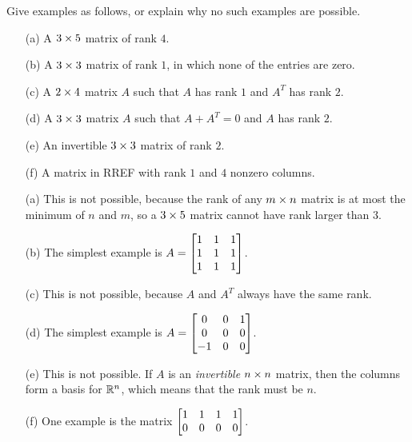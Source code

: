 \documentclass[a4paper]{amsart}
\renewenvironment{solution}{\SolutionInline}{\endSolutionInline}
\begin{document}
\begin{exercise}\label{ex-rank-ii}
 Give examples as follows, or explain why no such examples are
 possible. 
 \begin{itemize}
  \item[(a)] A $3\times 5$ matrix of rank $4$.
  \item[(b)] A $3\times 3$ matrix of rank $1$, in which none of the
   entries are zero.
  \item[(c)] A $2\times 4$ matrix $A$ such that $A$ has rank $1$ and
   $A^T$ has rank $2$.
  \item[(d)] A $3\times 3$ matrix $A$ such that $A+A^T=0$ and $A$ has
   rank $2$.
  \item[(e)] An invertible $3\times 3$ matrix of rank $2$.
  \item[(f)] A matrix in RREF with rank $1$ and $4$ nonzero columns. 
 \end{itemize}
\end{exercise}
\begin{solution}
 \begin{itemize}
  \item[(a)] This is not possible, because the rank of any $m\times n$
   matrix is at most the minimum of $n$ and $m$, so a $3\times 5$ matrix
   cannot have rank larger than $3$.
  \item[(b)] The simplest example is $A=\left[\begin{matrix} 1&1&1\\1&1&1\\1&1&1\end{matrix}\right]$.
  \item[(c)] This is not possible, because $A$ and $A^T$ always have
   the same rank.
  \item[(d)] The simplest example is $A=\left[\begin{matrix} 0&0&1\\0&0&0\\-1&0&0\end{matrix}\right]$.
  \item[(e)] This is not possible.  If $A$ is an \emph{invertible}
   $n\times n$ matrix, then the columns form a basis for ${\mathbb{R}}^n$, which
   means that the rank must be $n$.
  \item[(f)] One example is the matrix $\left[\begin{matrix} 1&1&1&1 \\ 0&0&0&0\end{matrix}\right]$.
 \end{itemize}
\end{solution}
\end{document}
